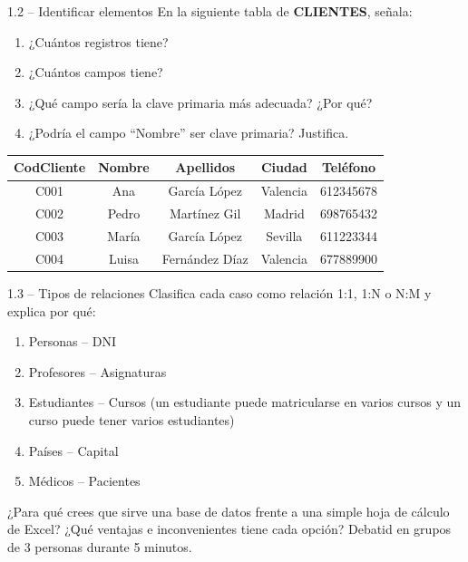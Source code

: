 \documentclass[12pt,a4paper]{article}
\begin{document}
\begin{ejercicio}{1.2 -- Identificar elementos}
En la siguiente tabla de \textbf{CLIENTES}, señala:
\begin{enumerate}[label=\alph*)]
  \item ¿Cuántos registros tiene?
  \item ¿Cuántos campos tiene?
  \item ¿Qué campo sería la clave primaria más adecuada? ¿Por qué?
  \item ¿Podría el campo ``Nombre'' ser clave primaria? Justifica.
\end{enumerate}

\begin{center}
\renewcommand{\arraystretch}{1.2}
\begin{tabular}{|c|c|c|c|c|}
\hline
\textbf{CodCliente} & \textbf{Nombre} & \textbf{Apellidos} & \textbf{Ciudad} & \textbf{Teléfono} \\
\hline
C001 & Ana & García López & Valencia & 612345678 \\
C002 & Pedro & Martínez Gil & Madrid & 698765432 \\
C003 & María & García López & Sevilla & 611223344 \\
C004 & Luisa & Fernández Díaz & Valencia & 677889900 \\
\hline
\end{tabular}
\end{center}
\end{ejercicio}

\begin{ejercicio}{1.3 -- Tipos de relaciones}
Clasifica cada caso como relación 1:1, 1:N o N:M y explica por qué:
\begin{enumerate}[label=\alph*)]
  \item Personas -- DNI
  \item Profesores -- Asignaturas
  \item Estudiantes -- Cursos (un estudiante puede matricularse en varios cursos y un curso puede tener varios estudiantes)
  \item Países -- Capital
  \item Médicos -- Pacientes
\end{enumerate}
\end{ejercicio}

\begin{reflexion}
¿Para qué crees que sirve una base de datos frente a una simple hoja de cálculo de Excel? ¿Qué ventajas e inconvenientes tiene cada opción? Debatid en grupos de 3 personas durante 5 minutos.
\end{reflexion}
\end{document}
